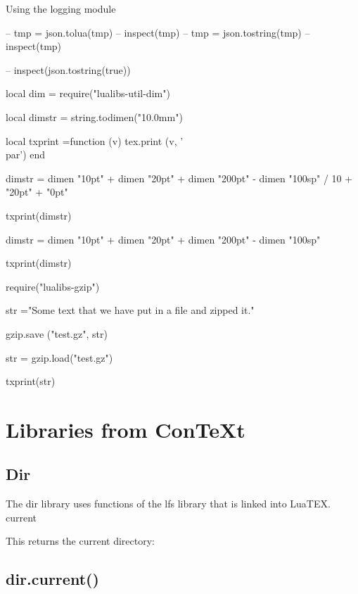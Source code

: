\begin{texexample}{Using the logging module}{}
\begin{luacode}
-- tmp = json.tolua(tmp)
-- inspect(tmp)
-- tmp = json.tostring(tmp)
-- inspect(tmp)

-- inspect(json.tostring(true))


local dim =   require("lualibs-util-dim")

local dimstr = string.todimen("10.0mm")

local txprint =function (v)
     				tex.print (v, '\\par')
                  end

dimstr = dimen "10pt" + dimen "20pt" + dimen "200pt" - dimen "100sp" / 10 + "20pt" + "0pt"

txprint(dimstr)

dimstr = dimen "10pt" + dimen "20pt" + dimen "200pt" - dimen "100sp" 

txprint(dimstr)

require("lualibs-gzip") 

str ="Some text that we have put in a file and zipped it."

gzip.save ("test.gz", str)

str  = gzip.load("test.gz")


txprint(str)
\end{luacode}

\end{texexample}

\section{Libraries from ConTeXt}


\subsection*{Dir}

The dir library uses functions of the lfs library that is linked into LuaTEX.
current

This returns the current directory:

\subsection*{dir.current()}



\def\function#1{\leavevmode\noindent{\color{teal}
\parindent0pt\leavevmode\par \bfseries #1 }}
 
